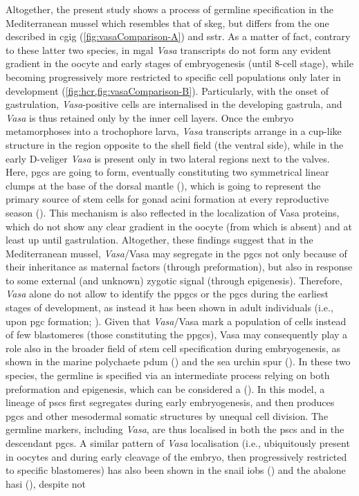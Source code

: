 Altogether, the present study shows a process of germline specification in the Mediterranean mussel which resembles that of \gls{skeg}, but differs from the one described in \gls{cgig} (\cref{fig:vasaComparison-A}) and \gls{sstr}. As a matter of fact, contrary to these latter two species, in \gls{mgal} \textit{Vasa} transcripts do not form any evident gradient in the oocyte and early stages of embryogenesis (until 8-cell stage), while becoming progressively more restricted to specific cell populations only later in development (\cref{fig:hcr,fig:vasaComparison-B}). Particularly, with the onset of gastrulation, \textit{Vasa}-positive cells are internalised in the developing gastrula, and \textit{Vasa} is thus retained only by the inner cell layers. Once the embryo metamorphoses into a trochophore larva, \textit{Vasa} transcripts arrange in a cup-like structure in the region opposite to the shell field (the ventral side), while in the early D-veliger \textit{Vasa} is present only in two lateral regions next to the valves. Here, \glspl{pgc} are going to form, eventually constituting two symmetrical linear clumps at the base of the dorsal mantle (), which is going to represent the primary source of stem cells for gonad acini formation at every reproductive season (). This mechanism is also reflected in the localization of Vasa proteins, which do not show any clear gradient in the oocyte (from which is absent) and at least up until gastrulation. Altogether, these findings suggest that in the Mediterranean mussel, \textit{Vasa}/Vasa may segregate in the \glspl{pgc} not only because of their inheritance as maternal factors (through preformation), but also in response to some external (and unknown) zygotic signal (through epigenesis). Therefore, \textit{Vasa} alone do not allow to identify the \glspl{ppgc} or the \glspl{pgc} during the earliest stages of development, as instead it has been shown in adult individuals (i.e., upon \gls{pgc} formation; ). Given that \textit{Vasa}/Vasa mark a population of cells instead of few blastomeres (those constituting the \glspl{ppgc}), Vasa may consequently play a role also in the broader field of stem cell specification during embryogenesis, as shown in the marine polychaete \gls{pdum} () and the sea urchin \gls{spur} (). In these two species, the germline is specified via an intermediate process relying on both preformation and epigenesis, which can be considered a  (). In this model, a lineage of \glspl{psc} first segregates during early embryogenesis, and then produces \glspl{pgc} and other mesodermal somatic structures by unequal cell division. The germline markers, including \textit{Vasa}, are thus localised in both the \glspl{psc} and in the descendant \glspl{pgc}. A similar pattern of \textit{Vasa} localisation (i.e., ubiquitously present in oocytes and during early cleavage of the embryo, then progressively restricted to specific blastomeres) has also been shown in the snail \gls{iobs} () and the abalone \gls{hasi} (), despite not 